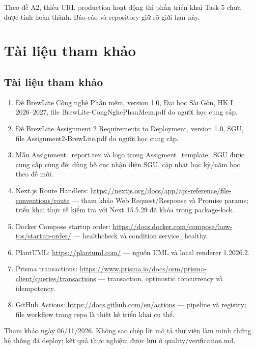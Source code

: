 \documentclass[a4paper,12pt,oneside]{report}
\begin{document}
Theo đề A2, thiếu URL production hoạt động thì phần triển khai Task 5 chưa được tính hoàn thành. Báo cáo và repository giữ rõ giới hạn này.


\chapter{Tài liệu tham khảo}

\section{Tài liệu tham khảo}

\begin{enumerate}
\item Đề BrewLite Công nghệ Phần mềm, version 1.0, Đại học Sài Gòn, HK I 2026–2027, file BrewLite-CongNghePhanMem.pdf do người học cung cấp.
\item Đề BrewLite Assignment 2 Requirements to Deployment, version 1.0, SGU, file Assignment2-BrewLite.pdf do người học cung cấp.
\item Mẫu Assignment\_report.tex và logo trong Assigment\_template\_SGU được cung cấp cùng đề; dùng bố cục nhận diện SGU, cập nhật học kỳ/\allowbreak{}năm học theo đề mới.
\item Next.js Route Handlers: \url{https://nextjs.org/docs/app/api-reference/file-conventions/route} — tham khảo Web Request/\allowbreak{}Response và Promise params; triển khai thực tế kiểm tra với Next 15.5.29 đã khóa trong package-lock.
\item Docker Compose startup order: \url{https://docs.docker.com/compose/how-tos/startup-order/} — healthcheck và condition service\_healthy.
\item PlantUML: \url{https://plantuml.com/} — nguồn UML và local renderer 1.2026.2.
\item Prisma transactions: \url{https://www.prisma.io/docs/orm/prisma-client/queries/transactions} — transaction, optimistic concurrency và idempotency.
\item GitHub Actions: \url{https://docs.github.com/en/actions} — pipeline và registry; file workflow trong repo là thiết kế triển khai cụ thể.
\end{enumerate}

Tham khảo ngày 06/\allowbreak{}11/\allowbreak{}2026. Không sao chép lời mô tả thư viện làm minh chứng hệ thống đã deploy; kết quả thực nghiệm được lưu ở quality/\allowbreak{}verification.md.
\end{document}
